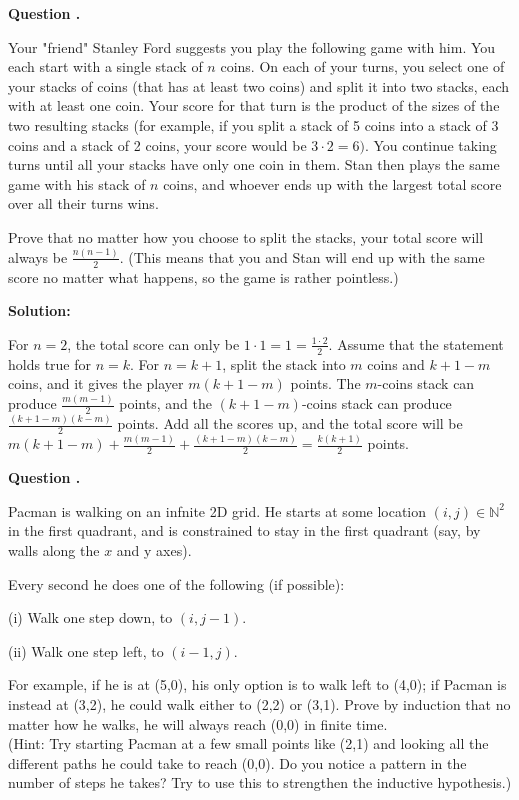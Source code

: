 \documentclass[12pt]{article}
\newcounter{questionnumber}
\newenvironment{question}[1][]{\stepcounter{questionnumber}\par\noindent\textbf{Question \thequestionnumber. #1}\par}{\par}
\newenvironment{solution}{\par\noindent\textbf{Solution:}\par}{\par\vspace{1em}}
\begin{document}
\begin{question}
    Your "friend" Stanley Ford suggests you play the following game with him. You each start with a single stack of $n$ coins. On each of your turns, you select one of your stacks of coins (that has at least two coins) and split it into two stacks, each with at least one coin. Your score for that turn is the product of the sizes of the two resulting stacks (for example, if you split a stack of 5 coins into a stack of 3 coins and a stack of 2 coins, your score would be $3\cdot2=6).$ You continue taking turns until all your stacks have only one coin in them. Stan then plays the same game with his stack of $n$ coins, and whoever ends up with the largest total score over all their turns wins.
    
    Prove that no matter how you choose to split the stacks, your total score will always be $\frac{n(n-1)}2.$ (This means that you and Stan will end up with the same score no matter what happens, so the game is rather pointless.)
\end{question}
\begin{solution}
    For $n=2$, the total score can only be $1\cdot 1=1=\frac{1\cdot 2}{2}$.
    Assume that the statement holds true for $n=k$. 
    For $n=k+1$, split the stack into $m$ coins and $k+1-m$ coins, and it gives the player $m(k+1-m)$ points.
    The $m$-coins stack can produce $\frac{m\left( m-1 \right)}{2}$ points, and the $(k+1-m)$-coins stack can produce $\frac{\left( k+1-m \right) \left( k-m \right)}{2}$ points.
    Add all the scores up, and the total score will be $m(k+1-m)+\frac{m\left( m-1 \right)}{2}+\frac{\left( k+1-m \right) \left( k-m \right)}{2}=\frac{k\left( k+1 \right)}{2}$ points.
\end{solution}
\begin{question}
    Pacman is walking on an infnite 2D grid. He starts at some location $(i,j)\in\mathbb{N}^2$ in the first quadrant,
    and is constrained to stay in the first quadrant (say, by walls along the $x$ and y axes).

    Every second he does one of the following (if possible):

    (i) Walk one step down, to $( i, j-1) .$

    (ii) Walk one step left, to $(i-1,j).$

    For example, if he is at (5,0), his only option is to walk left to (4,0); if Pacman is instead at (3,2), he could walk either to (2,2) or (3,1).
    Prove by induction that no matter how he walks, he will always reach (0,0) in finite time.\\
    (Hint: Try starting Pacman at a few small points like (2,1) and looking all the different paths he could take to reach (0,0). Do you notice a pattern in the number of steps he takes? Try to use this to strengthen the inductive hypothesis.)
\end{question}
\end{document}
